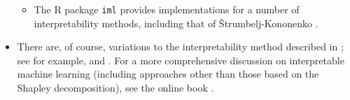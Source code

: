 \begin{itemize}
\begin{itemize}
	\item
		The {\color{red}R package} 
		\texttt{iml} \cite{Molnar2018} %
		provides implementations for a number of interpretability methods,
		including that of \v{S}trumbelj-Kononenko \cite{Strumbelj2010}.

	\end{itemize}

\item
	There are, of course, variations to the interpretability method described in \cite{Strumbelj2010};
	see for example, \cite{Lipovestsky2001} and \cite{Lundberg2017}. 
	For a more comprehensive discussion on interpretable machine learning
	(including approaches other than those based on the Shapley decomposition),
	see the {\color{red}online book} \cite{Molnar2019}.

\end{itemize}



\renewcommand{\theenumi}{\roman{enumi}}
\renewcommand{\labelenumi}{\textnormal{(\theenumi)}$\;\;$}

